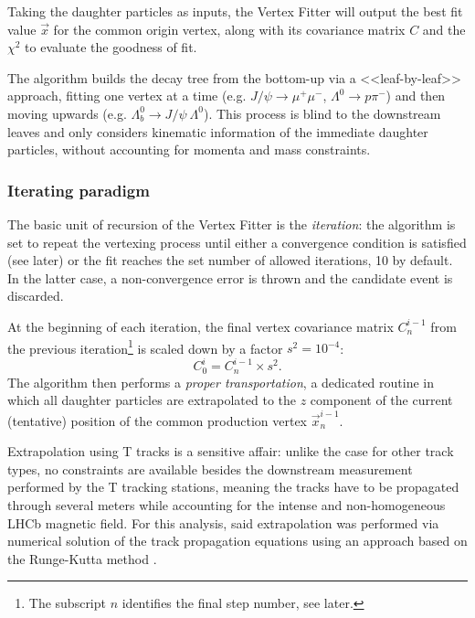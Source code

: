 Taking the daughter particles as inputs, the Vertex Fitter will output the best fit value $\vec{x}$ for the common origin vertex, along with its covariance matrix $C$ and the $\chi^2$ to evaluate the goodness of fit.

The algorithm builds the decay tree from the bottom-up via a <<leaf-by-leaf>> approach, fitting one vertex at a time (e.g. $J/\psi \rightarrow \mu^+ \mu^-$, $\Lambda^0 \rightarrow p \pi^-$) and then moving upwards (e.g. $\Lambda_b^0 \rightarrow J/\psi~\Lambda^0$).
This process is blind to the downstream leaves and only considers kinematic information of the immediate daughter particles, without accounting for momenta and mass constraints.

\subsubsection{Iterating paradigm}
The basic unit of recursion of the Vertex Fitter is the \textit{iteration}:
the algorithm is set to repeat the vertexing process until either a convergence condition is satisfied (see later) or the fit reaches the set number of allowed iterations, 10 by default.
In the latter case, a non-convergence error is thrown and the candidate event is discarded.

At the beginning of each iteration, the final vertex covariance matrix $C^{i-1}_n$ from the previous iteration\footnote{The subscript $n$ identifies the final step number, see later.} is scaled down by a factor $s^2 = {10}^{-4}$:
\begin{equation}
	C^{i}_0 = C^{i-1}_n \times s^2.
\end{equation}
The algorithm then performs a \textit{proper transportation}, a dedicated routine in which all daughter particles are extrapolated to the $z$ component of the current (tentative) position of the common production vertex $\vec{x}_n^{i-1}$.

Extrapolation using T tracks is a sensitive affair:
unlike the case for other track types, no constraints are available besides the downstream measurement performed by the T tracking stations, meaning the tracks have to be propagated through several meters while accounting for the intense and non-homogeneous LHCb magnetic field.
For this analysis, said extrapolation was performed via numerical solution of the track propagation equations using an approach based on the Runge-Kutta method \cite{Bos:1070314} \cite{Hairer1993}.

